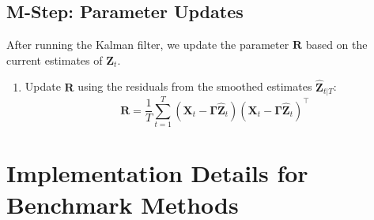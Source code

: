 \documentclass[11pt]{article}
\theoremstyle{plain}
\theoremstyle{definition}
\theoremstyle{remark}
\numberwithin{equation}{section}
\begin{document}
\subsection{M-Step: Parameter Updates}

After running the Kalman filter, we update the parameter $\mathbf{R}$ based on the current estimates of $\mathbf{Z}_t$.

\begin{enumerate}
    \item Update $\mathbf{R}$ using the residuals from the smoothed estimates $\hat{\mathbf{Z}}_{t|T}$:
    \[\mathbf{R} = \frac{1}{T} \sum_{t=1}^{T} \left( \mathbf{X}_t - \mathbf{\Gamma} \hat{\mathbf{Z}}_t \right) \left( \mathbf{X}_t - \mathbf{\Gamma} \hat{\mathbf{Z}}_t \right)^\top
\]

\end{enumerate}



\section{Implementation Details for Benchmark Methods}
\label{sec:benchmark_impl}
\end{document}
